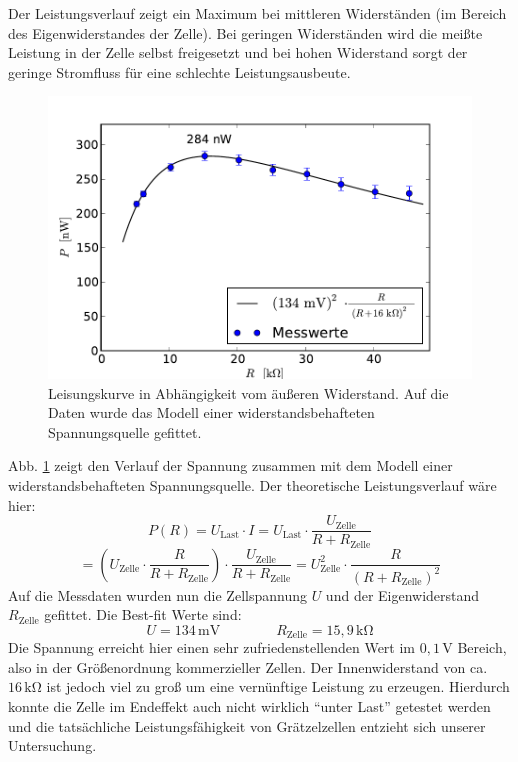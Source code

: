 \documentclass[11pt]{scrartcl}
\newcommand{\unit}[1]{\ensuremath{\,\mathrm{#1}}} %
\begin{document}
Der Leistungsverlauf zeigt ein Maximum bei mittleren Widerständen (im Bereich des Eigenwiderstandes der Zelle). Bei geringen Widerständen wird die meißte Leistung in der Zelle selbst freigesetzt und bei hohen Widerstand sorgt der geringe Stromfluss für eine schlechte Leistungsausbeute.
\begin{figure}[ht]
\begin{center}
\includegraphics[width=1.0\textwidth]{images/graetzel_leistung.pdf}
\end{center}
\vspace{-1.5\baselineskip}
\caption{Leisungskurve in Abhängigkeit vom äußeren Widerstand. Auf die Daten wurde das Modell einer widerstandsbehafteten Spannungsquelle gefittet.}
\label{leistungskurve}
\end{figure}
Abb. \ref{leistungskurve} zeigt den Verlauf der Spannung zusammen mit dem Modell einer widerstandsbehafteten Spannungsquelle. Der theoretische Leistungsverlauf wäre hier:
\[
P(R)= U_{\text{Last}}\cdot I
= U_{\text{Last}}\cdot \frac{U_{\text{Zelle}}}{R+R_{\text{Zelle}}}
\]
\[
= \left(U_{\text{Zelle}}\cdot \frac{R}{R+R_{\text{Zelle}}}\right)\cdot \frac{U_{\text{Zelle}}}{R+R_{\text{Zelle}}}
= U_{\text{Zelle}}^2\cdot \frac{R}{(R+R_{\text{Zelle}})^2}
\]
Auf die Messdaten wurden nun die Zellspannung $U$ und der Eigenwiderstand $R_{\text{Zelle}}$ gefittet. Die Best-fit Werte sind:
\[
U = 134\unit{mV}
\qquad\qquad
R_{\text{Zelle}} = 15,9\unit{k\Omega}
\]
Die Spannung erreicht hier einen sehr zufriedenstellenden Wert im $0,1\unit{V}$ Bereich, also in der Größenordnung kommerzieller Zellen. Der Innenwiderstand von ca. $16\unit{k\Omega}$ ist jedoch viel zu groß um eine vernünftige Leistung zu erzeugen. Hierdurch konnte die Zelle im Endeffekt auch nicht wirklich "`unter Last"' getestet werden und die tatsächliche Leistungsfähigkeit von Grätzelzellen entzieht sich unserer Untersuchung.
\end{document}
